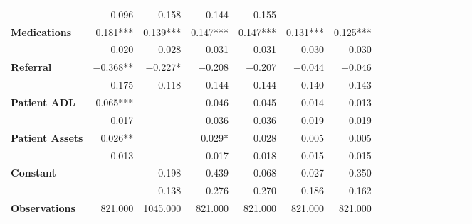 \begin{tabular}{@{\extracolsep{5pt}}lrrrrrrrrrrrrrrr}
{\bf } & 0.096\phantom{\phantom{)}***} & 0.158\phantom{\phantom{)}***} & 0.144\phantom{\phantom{)}***} & 0.155\phantom{\phantom{)}***} & \phantom{***} & \phantom{***} \\
{\bf Medications} & 0.181\phantom{)}*** & 0.139\phantom{)}*** & 0.147\phantom{)}*** & 0.147\phantom{)}*** & 0.131\phantom{)}*** & 0.125\phantom{)}*** \\
{\bf } & 0.020\phantom{\phantom{)}***} & 0.028\phantom{\phantom{)}***} & 0.031\phantom{\phantom{)}***} & 0.031\phantom{\phantom{)}***} & 0.030\phantom{\phantom{)}***} & 0.030\phantom{\phantom{)}***} \\
{\bf Referral} & $-$0.368\phantom{)}**\phantom{*} & $-$0.227\phantom{)}*\phantom{**} & $-$0.208\phantom{\phantom{)}***} & $-$0.207\phantom{\phantom{)}***} & $-$0.044\phantom{\phantom{)}***} & $-$0.046\phantom{\phantom{)}***} \\
{\bf } & 0.175\phantom{\phantom{)}***} & 0.118\phantom{\phantom{)}***} & 0.144\phantom{\phantom{)}***} & 0.144\phantom{\phantom{)}***} & 0.140\phantom{\phantom{)}***} & 0.143\phantom{\phantom{)}***} \\
{\bf Patient ADL} & 0.065\phantom{)}*** & \phantom{***} & 0.046\phantom{\phantom{)}***} & 0.045\phantom{\phantom{)}***} & 0.014\phantom{\phantom{)}***} & 0.013\phantom{\phantom{)}***} \\
{\bf } & 0.017\phantom{\phantom{)}***} & \phantom{***} & 0.036\phantom{\phantom{)}***} & 0.036\phantom{\phantom{)}***} & 0.019\phantom{\phantom{)}***} & 0.019\phantom{\phantom{)}***} \\
{\bf Patient Assets} & 0.026\phantom{)}**\phantom{*} & \phantom{***} & 0.029\phantom{)}*\phantom{**} & 0.028\phantom{\phantom{)}***} & 0.005\phantom{\phantom{)}***} & 0.005\phantom{\phantom{)}***} \\
{\bf } & 0.013\phantom{\phantom{)}***} & \phantom{***} & 0.017\phantom{\phantom{)}***} & 0.018\phantom{\phantom{)}***} & 0.015\phantom{\phantom{)}***} & 0.015\phantom{\phantom{)}***} \\
{\bf Constant} & \phantom{***} & $-$0.198\phantom{\phantom{)}***} & $-$0.439\phantom{\phantom{)}***} & $-$0.068\phantom{\phantom{)}***} & 0.027\phantom{\phantom{)}***} & 0.350\phantom{\phantom{)}***} \\
{\bf } & \phantom{***} & 0.138\phantom{\phantom{)}***} & 0.276\phantom{\phantom{)}***} & 0.270\phantom{\phantom{)}***} & 0.186\phantom{\phantom{)}***} & 0.162\phantom{\phantom{)}***} \\
{\bf Observations} & 821.000\phantom{\phantom{)}***} & 1045.000\phantom{\phantom{)}***} & 821.000\phantom{\phantom{)}***} & 821.000\phantom{\phantom{)}***} & 821.000\phantom{\phantom{)}***} & 821.000\phantom{\phantom{)}***} \\

\end{tabular}
